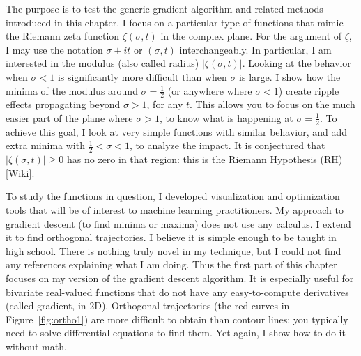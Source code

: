 \documentclass[oneside,10pt]{book}
\begin{document}
The purpose is to test the generic gradient algorithm and related methods introduced in this chapter. I focus on a particular type of functions that mimic the Riemann zeta function $\zeta(\sigma,t)$ in the complex plane. For the argument of $\zeta$, I may use the notation $\sigma+it$ or 
$(\sigma, t)$ interchangeably. In particular, I am interested in the modulus (also called radius) 
 $|\zeta(\sigma,t)|$. Looking at the behavior when $\sigma<1$ is significantly more difficult than when $\sigma$ is large. I show how the minima of the modulus around $\sigma=\frac{1}{2}$ (or anywhere  where $\sigma<1$) create ripple effects propagating beyond $\sigma> 1$, for any $t$. This allows you to focus on the much easier part of the plane where $\sigma>1$, to know what is happening at $\sigma=\frac{1}{2}$. To achieve this goal, I look at very simple functions with similar behavior, and add extra minima with $\frac{1}{2} < \sigma < 1$, to analyze the impact. It is conjectured that $|\zeta(\sigma,t)|\geq 0$ has no zero in that region: this is the 
\textcolor{index}{Riemann Hypothesis} (RH) [\href{https://en.wikipedia.org/wiki/Riemann_hypothesis}{Wiki}]. %

To study the functions in question, I developed visualization and optimization tools that will be of interest to machine learning practitioners.
 My approach to gradient descent (to find minima or maxima) does not use any calculus. I extend it to find orthogonal trajectories. I believe it is simple enough to be taught in high school. There is nothing truly novel in my technique, but I could not find any references explaining what I am doing. Thus the first part of this chapter focuses on my version of the gradient descent algorithm. It is especially useful for bivariate real-valued  functions
 that do not have any easy-to-compute derivatives (called gradient, in 2D). Orthogonal trajectories (the red curves in Figure~\ref{fig:ortho1}) are more difficult to obtain than contour lines: you typically need to solve differential equations to find them. Yet again, I show how to do it  without math.
\end{document}
